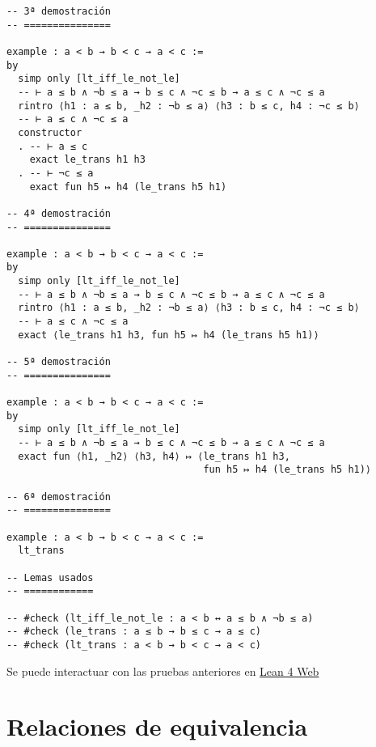 \begin{verbatim}
-- 3ª demostración
-- ===============

example : a < b → b < c → a < c :=
by
  simp only [lt_iff_le_not_le]
  -- ⊢ a ≤ b ∧ ¬b ≤ a → b ≤ c ∧ ¬c ≤ b → a ≤ c ∧ ¬c ≤ a
  rintro ⟨h1 : a ≤ b, _h2 : ¬b ≤ a⟩ ⟨h3 : b ≤ c, h4 : ¬c ≤ b⟩
  -- ⊢ a ≤ c ∧ ¬c ≤ a
  constructor
  . -- ⊢ a ≤ c
    exact le_trans h1 h3
  . -- ⊢ ¬c ≤ a
    exact fun h5 ↦ h4 (le_trans h5 h1)

-- 4ª demostración
-- ===============

example : a < b → b < c → a < c :=
by
  simp only [lt_iff_le_not_le]
  -- ⊢ a ≤ b ∧ ¬b ≤ a → b ≤ c ∧ ¬c ≤ b → a ≤ c ∧ ¬c ≤ a
  rintro ⟨h1 : a ≤ b, _h2 : ¬b ≤ a⟩ ⟨h3 : b ≤ c, h4 : ¬c ≤ b⟩
  -- ⊢ a ≤ c ∧ ¬c ≤ a
  exact ⟨le_trans h1 h3, fun h5 ↦ h4 (le_trans h5 h1)⟩

-- 5ª demostración
-- ===============

example : a < b → b < c → a < c :=
by
  simp only [lt_iff_le_not_le]
  -- ⊢ a ≤ b ∧ ¬b ≤ a → b ≤ c ∧ ¬c ≤ b → a ≤ c ∧ ¬c ≤ a
  exact fun ⟨h1, _h2⟩ ⟨h3, h4⟩ ↦ ⟨le_trans h1 h3,
                                  fun h5 ↦ h4 (le_trans h5 h1)⟩

-- 6ª demostración
-- ===============

example : a < b → b < c → a < c :=
  lt_trans

-- Lemas usados
-- ============

-- #check (lt_iff_le_not_le : a < b ↔ a ≤ b ∧ ¬b ≤ a)
-- #check (le_trans : a ≤ b → b ≤ c → a ≤ c)
-- #check (lt_trans : a < b → b < c → a < c)
\end{verbatim}
Se puede interactuar con las pruebas anteriores en \href{https://lean.math.hhu.de/\#url=https://raw.githubusercontent.com/jaalonso/Calculemus2/main/src/Preorden\_transitiva.lean}{Lean 4 Web}

\chapter{Relaciones de equivalencia}
\label{sec:org01b15f7}


